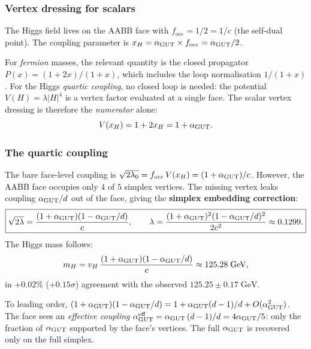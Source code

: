 \subsubsection{Vertex dressing for scalars}

The Higgs field lives on the AABB face with $f_\mathrm{occ} = 1/2 = 1/c$ (the self-dual point).  The coupling parameter is $x_H = \alpha_{\mathrm{GUT}} \times f_\mathrm{occ} = \alpha_{\mathrm{GUT}}/2$.

For \emph{fermion} masses, the relevant quantity is the closed propagator $P(x) = (1+2x)/(1+x)$, which includes the loop normalisation $1/(1+x)$.  For the Higgs \emph{quartic coupling}, no closed loop is needed: the potential $V(H) = \lambda|H|^4$ is a vertex factor evaluated at a single face.  The scalar vertex dressing is therefore the \emph{numerator} alone:
\begin{equation}
V(x_H) = 1 + 2x_H = 1 + \alpha_{\mathrm{GUT}}.
\end{equation}

\subsubsection{The quartic coupling}

\begin{theorem}
\label{thm:higgs_quartic}
The bare face-level coupling is $\sqrt{2\lambda_0} = f_\mathrm{occ}\,V(x_H) = (1+\alpha_{\mathrm{GUT}})/c$.  However, the AABB face occupies only $4$ of $5$ simplex vertices.  The missing vertex leaks coupling $\alpha_{\mathrm{GUT}}/d$ out of the face, giving the \textbf{simplex embedding correction}:
\begin{equation}
\boxed{\sqrt{2\lambda} = \frac{(1 + \alpha_{\mathrm{GUT}})(1 - \alpha_{\mathrm{GUT}}/d)}{c},
\qquad
\lambda = \frac{(1 + \alpha_{\mathrm{GUT}})^2(1 - \alpha_{\mathrm{GUT}}/d)^2}{2c^2} \approx 0.1299.}
\end{equation}
The Higgs mass follows:
\begin{equation}
m_H = v_H\,\frac{(1+\alpha_{\mathrm{GUT}})(1-\alpha_{\mathrm{GUT}}/d)}{c} \approx 125.28\;\mathrm{GeV},
\end{equation}
in $+0.02\%$ ($+0.15\sigma$) agreement with the observed $125.25 \pm 0.17\;\mathrm{GeV}$.
\end{theorem}

\begin{remark}
To leading order, $(1+\alpha_{\mathrm{GUT}})(1-\alpha_{\mathrm{GUT}}/d) = 1 + \alpha_{\mathrm{GUT}}(d-1)/d + O(\alpha_{\mathrm{GUT}}^2)$.  The face sees an \emph{effective coupling} $\alpha_{\mathrm{GUT}}^\mathrm{eff} = \alpha_{\mathrm{GUT}}\,(d-1)/d = 4\alpha_{\mathrm{GUT}}/5$: only the fraction of $\alpha_{\mathrm{GUT}}$ supported by the face's vertices.  The full $\alpha_{\mathrm{GUT}}$ is recovered only on the full simplex.
\end{remark}

